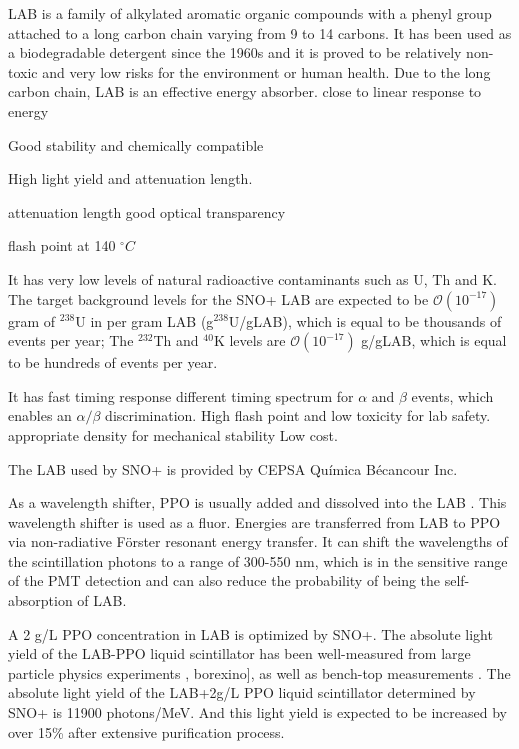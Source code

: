 LAB is a family of alkylated aromatic organic compounds with a phenyl group attached to a long carbon chain varying from 9 to 14 carbons\cite{wiki_LAB, collaboration2020development}. It has been used as a biodegradable detergent since the 1960s and it is proved to be relatively non-toxic and very low risks for the environment or human health\cite{wiki_LAB}. Due to the long carbon chain, LAB is an effective energy absorber.
close to linear response to energy


Good stability and chemically compatible




High light yield and attenuation length.


attenuation length
good optical transparency 

 flash point at 140 $^\circ C$

 It has very low levels of natural radioactive contaminants such as U, Th and K.
The target background levels for the SNO+ LAB are expected to be $\mathcal O(10^{-17})$ gram of $^{238}$U in per gram LAB (g$^{238}$U/gLAB), which is equal to be thousands of events per year;
The $^{232}$Th and $^{40}$K levels are $\mathcal O(10^{-17})$ g/gLAB, which is equal to be hundreds of events per year\cite{markchen_bkg}.


It has fast timing response different timing spectrum for $\alpha$ and $\beta$ events, which enables an $\alpha/\beta$ discrimination. 
High flash point and low toxicity for lab safety.
 appropriate density for mechanical stability
 Low cost.


The LAB used by SNO+ is provided by CEPSA Qu\'{i}mica B\'ecancour Inc.





As a wavelength shifter, PPO is usually added and dissolved into the LAB \cite{wunderly1990new}. This wavelength shifter is used as a fluor. Energies are transferred from LAB to PPO via non-radiative F{\"o}rster resonant energy transfer. It can shift the wavelengths of the scintillation photons to a range of 300-550 nm, which is in the sensitive range of the PMT detection and can also reduce the probability of being the self-absorption of LAB.

A 2 g/L PPO concentration in LAB is optimized by SNO+\cite{whitepaper}. The absolute light yield of the LAB-PPO liquid scintillator has been well-measured from large particle physics experiments \cite{xing2015preliminary}, borexino], as well as bench-top measurements \cite{xing2015preliminary,kaptanoglu2019cherenkov, novikov}. The absolute light yield of the LAB+2g/L PPO liquid scintillator determined by SNO+ is 11900 photons/MeV\cite{grullon2014light}. And this light yield is expected to be increased by over 15\% after extensive purification process\cite{snop_jinst}. 


